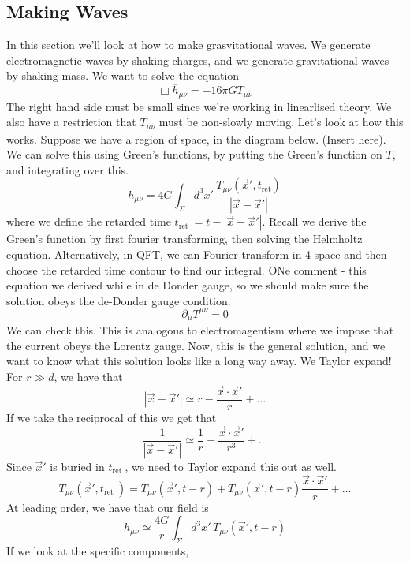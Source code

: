 \subsection{Making Waves}
In this section we'll look at how to make grasvitational waves. 
We generate electromagnetic waves by shaking charges, 
and we generate gravitational waves by shaking mass. 
We want to solve the equation 
\[
 \Box \overline{h } _{ \mu \nu }  =  - 16 \pi G T _{ \mu \nu }
\] The right hand side must be 
small since we're working in linearlised 
theory. 
We also have a restriction that $ T _{ \mu \nu } $ must be 
non-slowly moving. 
Let's look at how this works. 
Suppose we have a region of space, in the diagram 
below. (Insert here). 
We can solve this using Green's functions, 
by putting the Green's function on $ T $, and integrating 
over this. 
\[
 \overline{h } _{ \mu \nu }  = 4 G \int_{ \Sigma } d ^ 3 x ' \, 
 \frac{T _{ \mu \nu } \left( \vec{x} '  , t _{\text{ret} }  \right) }{ |\vec{x} - 
 \vec{x} ' | } 
\] where we define the retarded time $ t _{ \text{ret } }  = t - | \vec{x} - \vec{x} ' | $. Recall we derive 
the Green's function by first fourier transforming, 
then solving the Helmholtz equation. Alternatively, 
in QFT, we can Fourier transform in 4-space and 
then choose the retarded time contour to find 
our integral. 
ONe comment - this equation we derived while in 
de Donder gauge, so we should make sure 
the solution obeys the de-Donder gauge condition.
\[
 \partial  _ \mu T ^{ \mu \nu  }  = 0
\]  We can check this. 
This is analogous to electromagentism where 
we impose that the current obeys the Lorentz gauge. 
Now, this is the general solution, 
and we want to know what this solution looks like a long way away. 
We Taylor expand! For $ r \gg d $, we have 
that 
\[
 | \vec{x} - \vec{x} ' | \simeq r - \frac{\vec{x} \cdot  \vec{x}  '}{ r } + \dots 
\] If we take the reciprocal of this we 
get that 
\[
 \frac{1}{| \vec{x} - \vec{x} ' | } \simeq \frac{1}{r } + \frac{\vec{x} \cdot  \vec{x} ' }{ r ^ 3 } + \dots 
\] Since $ \vec{x} ' $ is buried in $ t_{\text{ret } } $, 
we need to Taylor expand this out as well. 
\[
	T_{ \mu \nu } \left( \vec{x} ', t_{ \text{ret } }   \right)  = 
	T _{ \mu \nu } \left( \vec{x} ' , t - r  \right)  + 
	\dot{ T } _{ \mu \nu } \left( \vec{x} ' , t - r  \right)  \frac{\vec{x} \cdot  \vec{x} ' }{ r } + \dots  
\]  At leading order, we have that our 
field is 
\[
 \overline{ h } _{ \mu  \nu } \simeq \frac{4 G }{ r } \int _{ \Sigma } 
 d ^ 3 x ' \, T _{ \mu \nu } \left( \vec{x} ', t - r   \right)  
\] If we look at the specific components, 
